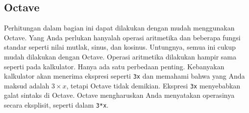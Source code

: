 \subsection{Octave}

Perhitungan dalam bagian ini dapat dilakukan dengan mudah menggunakan
Octave. Yang Anda perlukan hanyalah operasi aritmetika
dan beberapa fungsi standar seperti
nilai mutlak, sinus, dan kosinus. Untungnya, semua ini cukup mudah
dilakukan dengan Octave. Operasi aritmetika dilakukan hampir sama
seperti pada kalkulator. Hanya ada satu perbedaan penting. Kebanyakan
kalkulator akan menerima ekspresi seperti \texttt{3x} dan memahami
bahwa yang Anda maksud adalah $3\times x$, tetapi Octave tidak demikian.
Ekspresi \texttt{3x} menyebabkan galat sintaks di Octave. Octave mengharuskan
Anda menyatakan operasinya secara eksplisit, seperti dalam \texttt{3{*}x}. 

